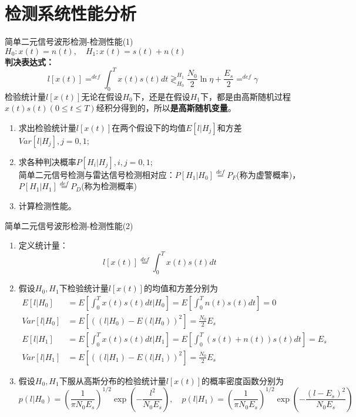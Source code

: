 \section{检测系统性能分析}

\begin{frame}{简单二元信号波形检测-检测性能(1)}
$H_0: x(t)=n(t), \quad H_1: x(t)=s(t)+n(t)$\\
\textbf{判决表达式：}
\[l[x(t)]\mathop{=}^{def}\int_{0}^{T}x(t)s(t)dt\mathop{\gtrless}_{H_0}^{H_1}\frac{N_0}{2}\ln\eta+\frac{E_s}{2}\mathop{=}^{def}\gamma \]
检验统计量$l[x(t)]$无论在假设$H_0$下，还是在假设$H_1$下，都是由高斯随机过程$x(t)s(t)(0\le t\le T)$经积分得到的，所以\textbf{是高斯随机变量}。
\begin{enumerate}
	\item 求出检验统计量$l[x(t)]$在两个假设下的均值$E[l|H_j]$和方差$Var[l|H_j],j=0,1$;
	\item 求各种判决概率$P[H_i|H_j],i,j=0,1$;\\
	简单二元信号检测与雷达信号检测相对应：$P[H_1|H_0]\mathop{=}\limits^{def}P_F$(称为虚警概率)，$P[H_1|H_1]\mathop{=}\limits^{def}P_D$(称为检测概率)
	\item 计算检测性能。
\end{enumerate}
\end{frame}

\begin{frame}[shrink]{简单二元信号波形检测-检测性能(2)}
\begin{enumerate}[1]
\item 定义统计量：
\[l[x(t)]\mathop{=}\limits^{def}\int_{0}^{T}x(t)s(t)dt \]
\item 假设$H_0,H_1$下检验统计量$l[x(t)]$的均值和方差分别为
\begin{align*}
E[l|H_0]&=E\left[\int_{0}^{T}x(t)s(t)dt|H_0\right]=E\left[\int_{0}^{T}n(t)s(t)dt\right]=0\\ 
Var[l|H_0]&=E[((l|H_0)-E(l|H_0))^2]=\frac{N_0}{2}E_s\\
E[l|H_1]&=E\left[\int_{0}^{T}x(t)s(t)dt|H_1\right]=E\left[\int_{0}^{T}(s(t)+n(t))s(t)dt\right]=E_s\\
Var[l|H_1]&=E[((l|H_1)-E(l|H_1))^2]=\frac{N_0}{2}E_s
\end{align*}
\item 假设$H_0,H_1$下服从高斯分布的检验统计量$l[x(t)]$的概率密度函数分别为\\
\[p(l|H_0)=\left(\frac{1}{\pi N_0E_s}\right)^{1/2}\exp\left(-\frac{l^2}{N_0E_s}\right),\quad p(l|H_1)=\left(\frac{1}{\pi N_0E_s}\right)^{1/2}\exp\left(-\frac{(l-E_s)^2}{N_0E_s}\right)\]
\end{enumerate}
\end{frame}

